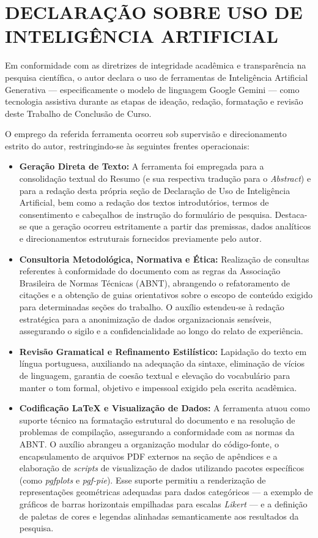 \section{DECLARAÇÃO SOBRE USO DE INTELIGÊNCIA ARTIFICIAL }

Em conformidade com as diretrizes de integridade acadêmica e transparência na pesquisa científica, o autor declara o uso de ferramentas de Inteligência Artificial Generativa — especificamente o modelo de linguagem Google Gemini — como tecnologia assistiva durante as etapas de ideação, redação, formatação e revisão deste Trabalho de Conclusão de Curso.

O emprego da referida ferramenta ocorreu sob supervisão e direcionamento estrito do autor, restringindo-se às seguintes frentes operacionais:
\begin{itemize}[topsep=0pt, noitemsep]
    \item \textbf{Geração Direta de Texto:} A ferramenta foi empregada para a consolidação textual do Resumo (e sua respectiva tradução para o \textit{Abstract}) e para a redação desta própria seção de Declaração de Uso de Inteligência Artificial, bem como a redação dos textos introdutórios, termos de consentimento e cabeçalhos de instrução do formulário de pesquisa. Destaca-se que a geração ocorreu estritamente a partir das premissas, dados analíticos e direcionamentos estruturais fornecidos previamente pelo autor.

    \item \textbf{Consultoria Metodológica, Normativa e Ética:} Realização de consultas referentes à conformidade do documento com as regras da Associação Brasileira de Normas Técnicas (ABNT), abrangendo o refatoramento de citações e a obtenção de guias orientativos sobre o escopo de conteúdo exigido para determinadas seções do trabalho. O auxílio estendeu-se à redação estratégica para a anonimização de dados organizacionais sensíveis, assegurando o sigilo e a confidencialidade ao longo do relato de experiência.

    \item \textbf{Revisão Gramatical e Refinamento Estilístico:} Lapidação do texto em língua portuguesa, auxiliando na adequação da sintaxe, eliminação de vícios de linguagem, garantia de coesão textual e elevação do vocabulário para manter o tom formal, objetivo e impessoal exigido pela escrita acadêmica.

    \item \textbf{Codificação LaTeX e Visualização de Dados:} A ferramenta atuou como suporte técnico na formatação estrutural do documento e na resolução de problemas de compilação, assegurando a conformidade com as normas da ABNT. O auxílio abrangeu a organização modular do código-fonte, o encapsulamento de arquivos PDF externos na seção de apêndices e a elaboração de \textit{scripts} de visualização de dados utilizando pacotes específicos (como \textit{pgfplots} e \textit{pgf-pie}). Esse suporte permitiu a renderização de representações geométricas adequadas para dados categóricos --- a exemplo de gráficos de barras horizontais empilhadas para escalas \textit{Likert} --- e a definição de paletas de cores e legendas alinhadas semanticamente aos resultados da pesquisa.


\end{itemize}
